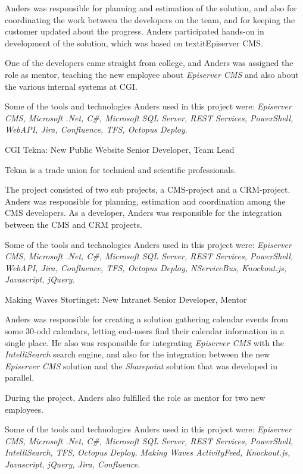 \documentclass[10pt]{article} %
\begin{document}
\begin{paracol}{2}
{\qquad Anders was responsible for planning and estimation of the solution, and also for coordinating the work between the developers on the team, and for keeping the customer updated about the progress. Anders participated hands-on in development of the solution, which was based on textit{Episerver CMS}.

\qquad One of the developers came straight from college, and Anders was assigned the role as mentor, teaching the new employee about \textit{Episerver CMS} and also about the various internal systems at CGI. 

\qquad Some of the tools and technologies Anders used in this project were: \textit{Episerver CMS, Microsoft .Net, C\#, Microsoft SQL Server, REST Services, PowerShell, WebAPI, Jira, Confluence, TFS, Octopus Deploy}.} 

{CGI} 
{Tekna: New Public Website} 
{Senior Developer, Team Lead} 
{Tekna is a trade union for technical and scientific professionals.

\qquad The project consisted of two sub projects, a CMS-project and a CRM-project. Anders was responsible for planning, estimation and coordination among the CMS developers. As a developer, Anders was responsible for the integration between the CMS and CRM projects.

\qquad Some of the tools and technologies Anders used in this project were: \textit{Episerver CMS, Microsoft .Net, C\#, Microsoft SQL Server, REST Services, PowerShell, WebAPI, Jira, Confluence, TFS, Octopus Deploy, NServiceBus, Knockout.js, Javascript, jQuery}.} 

{Making Waves} 
{Stortinget: New Intranet} 
{Senior Developer, Mentor} 
{Anders was responsible for creating a solution gathering calendar events from some 30-odd calendars, letting end-users find their calendar information in a single place. He also was responsible for integrating \textit{Episerver CMS} with the \textit{IntelliSearch} search engine, and also for the integration between the new \textit{Episerver CMS} solution and the \textit{Sharepoint} solution that was developed in parallel.

\qquad During the project, Anders also fulfilled the role as mentor for two new employees.

\qquad Some of the tools and technologies Anders used in this project were: \textit{Episerver CMS, Microsoft .Net, C\#, Microsoft SQL Server, REST Services, PowerShell, IntelliSearch, TFS, Octopus Deploy, Making Waves ActivityFeed, Knockout.js, Javascript, jQuery, Jira, Confluence}.} 




\end{paracol}
\end{document}
